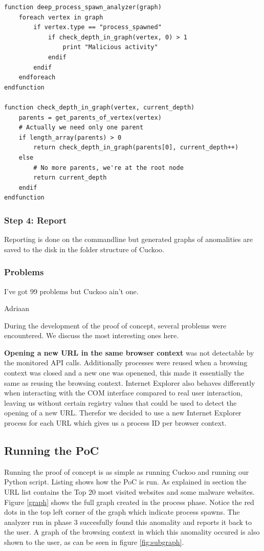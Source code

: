 \begin{lstlisting}
function deep_process_spawn_analyzer(graph)
    foreach vertex in graph
        if vertex.type == "process_spawned"
            if check_depth_in_graph(vertex, 0) > 1
                print "Malicious activity"
            endif
        endif
    endforeach
endfunction

function check_depth_in_graph(vertex, current_depth)
    parents = get_parents_of_vertex(vertex)
    # Actually we need only one parent
    if length_array(parents) > 0
        return check_depth_in_graph(parents[0], current_depth++)
    else
        # No more parents, we're at the root node
        return current_depth
    endif
endfunction
\end{lstlisting}

\subsubsection{Step 4: Report}

Reporting is done on the commandline but generated graphs of anomalities are saved to the disk in the folder structure of Cuckoo.

\subsubsection{Problems}
\label{99problems}
\epigraph{I've got 99 problems but Cuckoo ain't one.}{Adriaan}

During the development of the proof of concept, several problems were encountered. We discuss the most interesting ones here.

\textbf{Opening a new URL in the same browser context} was not detectable by the monitored API calls. Additionally processes were reused when a browsing context was closed and a new one was openened, this made it essentially the same as reusing the browsing context. Internet Explorer also behaves differently when interacting with the COM interface compared to real user interaction, leaving us without certain registry values that could be used to detect the opening of a new URL. Therefor we decided to use a new Internet Explorer process for each URL which gives us a process ID per browser context.

\subsection{Running the PoC}

Running the proof of concept is as simple as running Cuckoo and running our Python script. Listing  shows how the PoC is run. As explained in section  the URL list contains the Top 20 most visited websites and some malware websites. Figure \ref{graph} shows the full graph created in the process phase. Notice the red dots in the top left corner of the graph which indicate process spawns. The analyzer run in phase 3 succesfully found this anomality and reports it back to the user. A graph of the browsing context in which this anomality occured is also shown to the user, as can be seen in figure \ref{fig:subgraph}.


